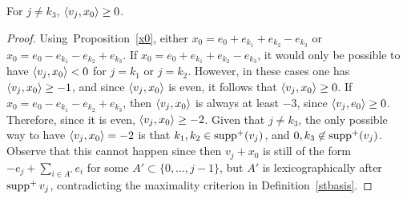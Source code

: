 

\begin{lemma}\label{positivity}
For $j \neq k_3$, $\left\langle v_j , x_0 \right\rangle \ge 0$. 
\end{lemma}
\begin{proof}
Using~Proposition~\ref{x0}, either ${x_0 = e_0 + e_{k_1} + e_{k_2} - e_{k_3}}$ or $x_0= e_0 - e_{k_1} - e_{k_2} + e_{k_3}$. If $x_0 = e_0 + e_{k_1} + e_{k_2} - e_{k_3}$, it would only be possible to have $\left\langle v_j , x_0 \right\rangle < 0$ for $j = k_1$ or $j = k_2$. However, in these cases one has $\left\langle v_j , x_0 \right\rangle \ge -1$, and since $\left\langle v_j , x_0 \right\rangle$ is even, it follows that $\left\langle v_j , x_0 \right\rangle \ge 0$. If ${x_0 = e_0 - e_{k_1} - e_{k_2} + e_{k_3}}$, then $\left\langle v_j , x_0 \right\rangle$ is always at least $-3$, since $\left\langle v_j , e_0 \right\rangle \ge 0$. Therefore, since it is even, $\left\langle v_j , x_0 \right\rangle \ge -2$. Given that $j \ne k_3$, the only possible way to have $\left\langle v_j , x_0 \right\rangle = -2$ is that $k_1, k_2 \in \operatorname{supp}^+(v_j)$, and $0,k_3 \not \in \operatorname{supp}^+(v_j)$. Observe that this cannot happen since then $v_j + x_0$ is still of the form $-e_j + \sum_{i \in A'} e_i$ for some $A' \subset \{0,\dots,j-1\}$, but $A'$ is lexicographically after $\operatorname{supp}^+ v_j$, contradicting the maximality criterion in Definition~\ref{stbasis}.
\end{proof}

%


